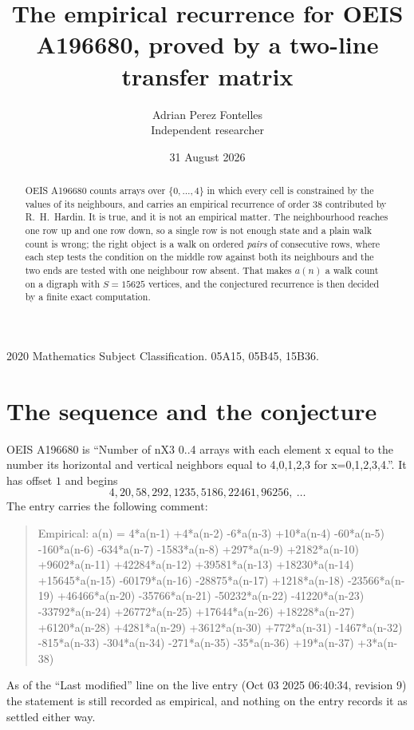 \documentclass[11pt,a4paper]{article}
\title{The empirical recurrence for OEIS A196680, proved by a two-line transfer matrix}
\author{Adrian Perez Fontelles\\ \small Independent researcher}
\date{31 August 2026}
\theoremstyle{plain}
\theoremstyle{definition}
\begin{document}
\maketitle

\begin{abstract}
OEIS A196680 counts arrays over $\{0,\dots,4\}$ in which every cell is constrained by the
values of its neighbours, and carries an empirical recurrence of order $38$ contributed
by R.~H.~Hardin. It is true, and it is not an empirical matter. The neighbourhood reaches one
row up and one row down, so a single row is not enough state and a plain walk count
is wrong; the right object is a walk on ordered \emph{pairs} of consecutive rows, where
each step tests the condition on the middle row against both its neighbours and the two
ends are tested with one neighbour row absent. That makes $a(n)$ a walk count on a digraph
with $S=15625$ vertices, and the conjectured recurrence is then decided by a finite exact
computation.
\end{abstract}

\noindent\small 2020 Mathematics Subject Classification. 05A15, 05B45, 15B36.\normalsize

\section{The sequence and the conjecture}

OEIS A196680 is ``Number of nX3 0..4 arrays with each element x equal to the number its horizontal and vertical neighbors equal to 4,0,1,2,3 for x=0,1,2,3,4.''. It has offset $1$ and begins
\[
4, 20, 58, 292, 1235, 5186, 22461, 96256,\ \dots
\]
The entry carries the following comment:
\begin{quote}\small
Empirical: a(n) = 4*a(n-1) +4*a(n-2) -6*a(n-3) +10*a(n-4) -60*a(n-5) -160*a(n-6) -634*a(n-7) -1583*a(n-8) +297*a(n-9) +2182*a(n-10) +9602*a(n-11) +42284*a(n-12) +39581*a(n-13) +18230*a(n-14) +15645*a(n-15) -60179*a(n-16) -28875*a(n-17) +1218*a(n-18) -23566*a(n-19) +46466*a(n-20) -35766*a(n-21) -50232*a(n-22) -41220*a(n-23) -33792*a(n-24) +26772*a(n-25) +17644*a(n-26) +18228*a(n-27) +6120*a(n-28) +4281*a(n-29) +3612*a(n-30) +772*a(n-31) -1467*a(n-32) -815*a(n-33) -304*a(n-34) -271*a(n-35) -35*a(n-36) +19*a(n-37) +3*a(n-38)
\end{quote}
As of the ``Last modified'' line on the live entry (Oct 03 2025 06:40:34, revision 9) the statement is
still recorded as empirical, and nothing on the entry records it as settled either way.
\end{document}

